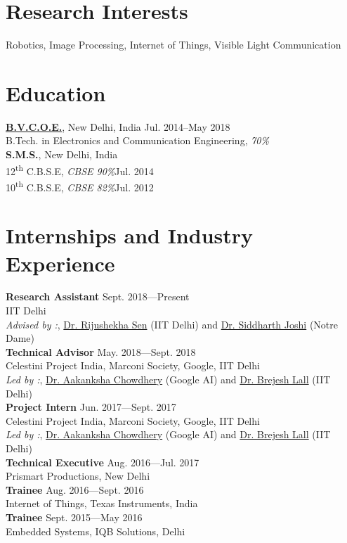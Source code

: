 \section{Research Interests}
Robotics, Image Processing, Internet of Things, Visible Light Communication

\section{Education}
\href{http://bvcoend.ac.in}{\textbf{B.V.C.O.E.}},
New Delhi, India \hfill{Jul. 2014--May 2018}\\
B.Tech. in Electronics and Communication Engineering, \emph{70\%}\\
\textbf{S.M.S.},
New Delhi, India \\
12\textsuperscript{th} C.B.S.E, \emph{CBSE 90\%}\hfill{Jul. 2014}\\
10\textsuperscript{th} C.B.S.E, \emph{CBSE 82\%}\hfill{Jul. 2012}\\


\section{Internships and Industry Experience}

\textbf{Research Assistant} \hfill {Sept. 2018---Present}\\
IIT Delhi\\
\emph{Advised by :}, \href{http://www.cse.iitd.ernet.in/~rijurekha/index.html}{Dr. Rijushekha Sen} (IIT Delhi) and \href{http://isn.ucsd.edu/~siddharth/}{Dr. Siddharth Joshi} (Notre Dame)\\
\textbf{Technical Advisor} \hfill {May. 2018---Sept. 2018}\\
Celestini Project India, Marconi Society, Google, IIT Delhi\\
\emph{Led by :}, \href{http://www.achowdhery.com/}{Dr. Aakanksha Chowdhery} (Google AI) and \href{http://ee.iitd.ernet.in/people/brijeshlall.html}{Dr. Brejesh Lall} (IIT Delhi)\\
\textbf{Project Intern} \hfill {Jun. 2017---Sept. 2017}\\
Celestini Project India, Marconi Society, Google, IIT Delhi\\
\emph{Led by :}, \href{http://www.achowdhery.com/}{Dr. Aakanksha Chowdhery} (Google AI) and \href{http://ee.iitd.ernet.in/people/brijeshlall.html}{Dr. Brejesh Lall} (IIT Delhi)\\
\textbf{Technical Executive} \hfill {Aug. 2016---Jul. 2017}\\
Prismart Productions, New Delhi\\
\textbf{Trainee} \hfill {Aug. 2016---Sept. 2016}\\
Internet of Things, Texas Instruments, India\\
\textbf{Trainee} \hfill {Sept. 2015---May 2016}\\
Embedded Systems, IQB Solutions, Delhi\\

